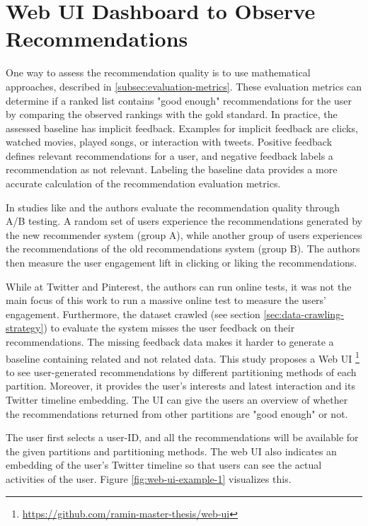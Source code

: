 \section{Web UI Dashboard to Observe Recommendations}
\label{sec:web-ui}
One way to assess the recommendation quality is to use mathematical approaches, described in \ref{subsec:evaluation-metrics}. These evaluation metrics can determine if a ranked list contains "good enough" recommendations for the user by comparing the observed rankings with the gold standard. In practice, the assessed baseline has implicit feedback. Examples for implicit feedback are clicks, watched movies, played songs, or interaction with tweets. Positive feedback defines relevant recommendations for a user, and negative feedback labels a recommendation as not relevant. Labeling the baseline data provides a more accurate calculation of the recommendation evaluation metrics.


In studies like \cite{eksombatchaiPixieSystemRecommending2018} and \cite{goelWhoToFollowSystemTwitter2015} the authors evaluate the recommendation quality through A/B testing. A random set of users experience the recommendations generated by the new recommender system (group A), while another group of users experiences the recommendations of the old recommendations system (group B). The authors then measure the user engagement lift in clicking or liking the recommendations. 


While at Twitter and Pinterest, the authors can run online tests, it was not the main focus of this work to run a massive online test to measure the users' engagement. Furthermore, the dataset crawled (see section \ref{sec:data-crawling-strategy}) to evaluate the system misses the user feedback on their recommendations. The missing feedback data makes it harder to generate a baseline containing related and not related data. This study proposes a Web UI \footnote{\url{https://github.com/ramin-master-thesis/web-ui}} to see user-generated recommendations by different partitioning methods of each partition. Moreover, it provides the user's interests and latest interaction and its Twitter timeline embedding. The UI can give the users an overview of whether the recommendations returned from other partitions are "good enough" or not.


The user first selects a user-ID, and all the recommendations will be available for the given partitions and partitioning methods. The web UI also indicates an embedding of the user's Twitter timeline so that users can see the actual activities of the user. Figure \ref{fig:web-ui-example-1} visualizes this.


